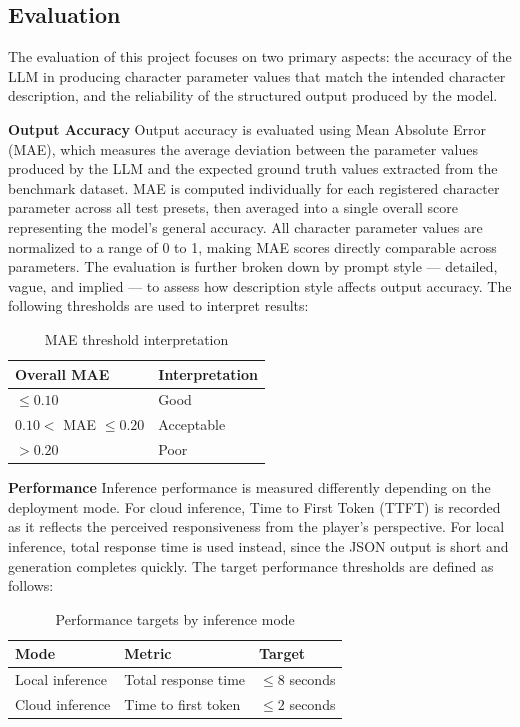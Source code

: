 \subsection{Evaluation}
The evaluation of this project focuses on two primary aspects: the accuracy of the LLM in producing character parameter values that match the intended character description, and the reliability of the structured output produced by the model.

\textbf{Output Accuracy}
Output accuracy is evaluated using Mean Absolute Error (MAE), which measures the average deviation between the parameter values produced by the LLM and the expected ground truth values extracted from the benchmark dataset. MAE is computed individually for each registered character parameter across all test presets, then averaged into a single overall score representing the model's general accuracy. All character parameter values are normalized to a range of 0 to 1, making MAE scores directly comparable across parameters. The evaluation is further broken down by prompt style — detailed, vague, and implied — to assess how description style affects output accuracy. The following thresholds are used to interpret results:

\begin{table}[h]
\centering
\begin{tabular}{|l|l|}
\hline
\textbf{Overall MAE} & \textbf{Interpretation} \\
\hline
$\leq 0.10$ & Good \\
$0.10 <$ MAE $\leq 0.20$ & Acceptable \\
$> 0.20$ & Poor \\
\hline
\end{tabular}
\caption{MAE threshold interpretation}
\end{table}

\newpage
\textbf{Performance}
Inference performance is measured differently depending on the deployment mode. For cloud inference, Time to First Token (TTFT) is recorded as it reflects the perceived responsiveness from the player's perspective. For local inference, total response time is used instead, since the JSON output is short and generation completes quickly. The target performance thresholds are defined as follows:
\begin{table}[h]
\centering
\begin{tabular}{|l|l|l|}
\hline
\textbf{Mode} & \textbf{Metric} & \textbf{Target} \\
\hline
Local inference  & Total response time & $\leq 8$ seconds \\
Cloud inference  & Time to first token & $\leq 2$ seconds \\
\hline
\end{tabular}
\caption{Performance targets by inference mode}
\end{table}

